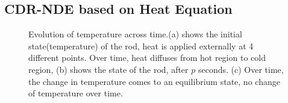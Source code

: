 \documentclass{article} %
\begin{document}
\subsection{ CDR-NDE based on Heat Equation } 
\begin{figure}[t]
\begin{center}     %
{}
\end{center}
\caption{Evolution of temperature across time.(a) shows the initial state(temperature) of the rod, heat is applied externally at 4 different points. Over time, heat diffuses from hot region to cold region, (b) shows the state of the rod, after $p$ seconds. (c) Over time, the change in temperature comes to an equilibrium state, no change of temperature over time. }
\label{fig:heat}
\end{figure}
\end{document}
